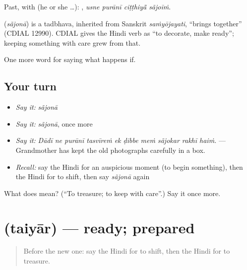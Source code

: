 Past, with  (he or she …):    , \emph{usne purānī ciṭṭhiyā̃ sãjoīṁ}.

\begin{cousinweb}
\textbf{} (\emph{sãjonā}) is a tadbhava, inherited from Sanskrit \emph{saṁyōjayati}, \textquotedblleft{}brings together\textquotedblright{} (CDIAL 12990). CDIAL gives the Hindi verb as \textquotedblleft{}to decorate, make ready\textquotedblright{}; keeping something with care grew from that.
\end{cousinweb}

\begin{grammarlens}[title={What you've built}]
One more word for saying what happens if.
\end{grammarlens}

\subsection*{Your turn}
\begin{itemize}
\raggedright
  \item \emph{Say it:} \emph{sãjonā}
  \item \emph{Say it:} \emph{sãjonā}, once more
  \item \emph{Say it:} \emph{Dādī ne purānī tasvīreṁ ek ḍibbe meṁ sãjokar rakhī haiṁ.} — Grandmother has kept the old photographs carefully in a box.
  \item \emph{Recall:} say the Hindi for an auspicious moment (to begin something), then the Hindi for to shift, then say \emph{sãjonā} again
\end{itemize}

\begin{tcolorbox}[breakable,colback=teal!4,colframe=teal!35!black,title={Before you move on}]
What does  mean? (\textquotedblleft{}To treasure; to keep with care\textquotedblright{}.) Say it once more.
\end{tcolorbox}
\section[\texorpdfstring{\hi{तैयार} (taiyār)}{तैयार (taiyār)}]{ (taiyār) — ready; prepared}

\label{lesson:HI-C538-taiyar}



\begin{quote}
Before the new one: say the Hindi for to shift, then the Hindi for to treasure.
\end{quote}

